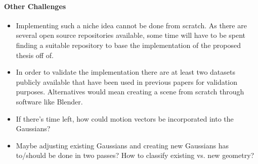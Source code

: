 \paragraph{Other Challenges}
\begin{itemize}
	\item Implementing such a niche idea cannot be done from scratch. As there are several open source repositories available, some time will have to be spent finding a suitable repository to base the implementation of the proposed thesis off of.
	\item In order to validate the implementation there are at least two datasets publicly available that have been used in previous papers for validation purposes. Alternatives would mean creating a scene from scratch through software like Blender.
	\item If there's time left, how could motion vectors be incorporated into the Gaussians?
	\item Maybe adjusting existing Gaussians and creating new Gaussians has to/should be done in two passes? How to classify existing vs. new geometry?
\end{itemize}





